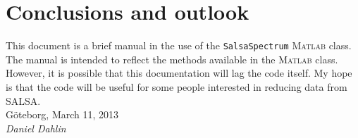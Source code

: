 \documentclass[11pt,a4paper]{article}
\begin{document}
\section{Conclusions and outlook}
\label{sec:conclusion-outlook}

This document is a brief manual in the use of the
\texttt{SalsaSpectrum} \textsc{Matlab} class. The manual is intended to reflect
the methods available in the \textsc{Matlab} class. However, it is possible
that this documentation will lag the code itself. My hope is that the
code will be useful for some people interested in reducing data from
SALSA.\\

\hfill G{\"o}teborg, March 11, 2013\\

\hfill \emph{Daniel Dahlin}
\end{document}
